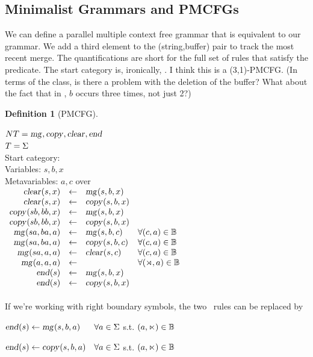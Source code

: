 \documentclass[12pt]{article}
\theoremstyle{definition}
\newtheorem{definition}{Definition}[section]
\begin{document}
\subsection{Minimalist Grammars and PMCFGs}
\label{sec:minimalist-grammars}


We can define a parallel multiple context free grammar that is equivalent to our grammar. We add a third element to the (string,buffer) pair to track the most recent merge. The quantifications are short for the full set of rules that satisfy the predicate. The start category is, ironically, \ed.
I think this is a (3,1)-PMCFG. (In terms of the class, is there a problem with the deletion of the buffer? What about the fact that in \cp, $b$ occurs three times, not just 2?)

\begin{definition}[PMCFG]\

  \noindent$NT = \text{\textsl{mg}},\text{\textsl{copy}},\text{\textsl{clear}},\text{\textsl{end}}$\\
  $T = \Sigma$\\
  Start category: \ed\\
  Variables: $s,b,x$\\
  Metavariables: $a,c$ over \sg\\
  
$  \begin{array}{r c l l}
    \text{\textsl{clear}}(s,x) &\leftarrow& \text{\textsl{mg}}(s,b,x)\\
    \text{\textsl{clear}}(s,x) &\leftarrow& \text{\textsl{copy}}(s,b,x)\\
    \text{\textsl{copy}}(sb,bb,x) &\leftarrow& \text{\textsl{mg}}(s,b,x)\\
    \text{\textsl{copy}}(sb,bb,x) &\leftarrow& \text{\textsl{copy}}(s,b,x)\\
    \text{\textsl{mg}}(sa,ba,a) &\leftarrow& \text{\textsl{mg}}(s,b,c) & \forall (c,a)\in\mathbb{B}\\
    \text{\textsl{mg}}(sa,ba,a) &\leftarrow& \text{\textsl{copy}}(s,b,c)&\forall (c,a)\in\mathbb{B}\\
    \text{\textsl{mg}}(sa,a,a) &\leftarrow& \text{\textsl{clear}}(s,c) &\forall (c,a)\in\mathbb{B}\\
    \text{\textsl{mg}}(a,a,a) &\leftarrow&  &\forall(\rtimes,a)\in\mathbb{B}\\
    \text{\textsl{end}}(s) &\leftarrow& \text{\textsl{mg}}(s,b,x)\\
    \text{\textsl{end}}(s) &\leftarrow& \text{\textsl{copy}}(s,b,x)\\    
   \end{array}$\\\\

   If we're working with right boundary symbols, the two \ed~rules can be replaced by
   
   $\text{\textsl{end}}(s)\leftarrow\text{\textsl{mg}}(s,b,a) ~~~~~\forall a\in\Sigma$ s.t. $(a,\ltimes)\in\mathbb{B}$
   
   $\text{\textsl{end}}(s)\leftarrow\text{\textsl{copy}}(s,b,a) ~~~\forall a\in\Sigma$ s.t. $(a,\ltimes)\in\mathbb{B}$
\label{def:pmcfg}
 \end{definition}
\end{document}
